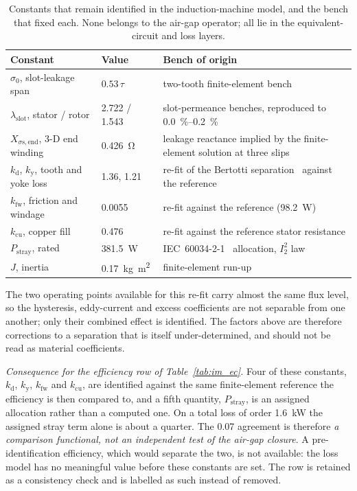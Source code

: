 \documentclass[10pt,a4paper,twocolumn]{article}
\theoremstyle{plain}
\theoremstyle{remark}
\begin{document}
\begin{table}[!t]
\centering
\begin{threeparttable}
\footnotesize
\begin{tabular}{@{}llp{46mm}@{}}
\toprule
Constant & Value & Bench of origin \\
\midrule
$\sigma_0$, slot-leakage span & $0.53\,\tau$ & two-tooth finite-element bench \\
$\lambda_{\mathrm{slot}}$, stator / rotor & 2.722 / 1.543 & slot-permeance benches, reproduced to \SIrange{0.0}{0.2}{\percent} \\
$X_{\sigma\mathrm{s,end}}$, 3-D end winding & \SI{0.426}{\ohm} & leakage reactance implied by the finite-element solution at three slips \\
$k_{\mathrm{d}}$, $k_{\mathrm{y}}$, tooth and yoke loss & 1.36, 1.21 & re-fit of the Bertotti separation~\cite{bertotti} against the reference\tnote{*} \\
$k_{\mathrm{fw}}$, friction and windage & 0.0055 & re-fit against the reference (\SI{98.2}{\watt}) \\
$k_{\mathrm{cu}}$, copper fill & 0.476 & re-fit against the reference stator resistance \\
$P_{\mathrm{stray}}$, rated & \SI{381.5}{\watt} & IEC~60034-2-1~\cite{iec} allocation, $I_2^2$ law \\
$J$, inertia & \SI{0.17}{\kilogram\metre\squared} & finite-element run-up \\
\bottomrule
\end{tabular}
\begin{tablenotes}[flushleft]\footnotesize
\item[*] The two operating points available for this re-fit carry almost
the same flux level, so the hysteresis, eddy-current and excess
coefficients are not separable from one another; only their combined
effect is identified. The factors above are therefore corrections to a
separation that is itself under-determined, and should not be read as
material coefficients.
\item \emph{Consequence for the efficiency row of
Table~\ref{tab:im_ec}.} Four of these constants, $k_{\mathrm{d}}$,
$k_{\mathrm{y}}$, $k_{\mathrm{fw}}$ and $k_{\mathrm{cu}}$, are
identified against the same finite-element reference the efficiency is
then compared to, and a fifth quantity, $P_{\mathrm{stray}}$, is an
assigned allocation rather than a computed one. On a total loss of order
\SI{1.6}{\kilo\watt} the assigned stray term alone is about a quarter.
The \SI{0.07}{\pp} agreement is therefore \emph{a comparison
functional, not an independent test of the air-gap closure}. A
pre-identification efficiency, which would separate the two, is not
available: the loss model has no meaningful value before these constants
are set. The row is retained as a consistency check and is labelled as
such instead of removed.
\end{tablenotes}
\end{threeparttable}
\caption{Constants that remain identified in the induction-machine
model, and the bench that fixed each. None belongs to the air-gap
operator; all lie in the equivalent-circuit and loss layers.}
\label{tab:identified}
\end{table}
\end{document}
